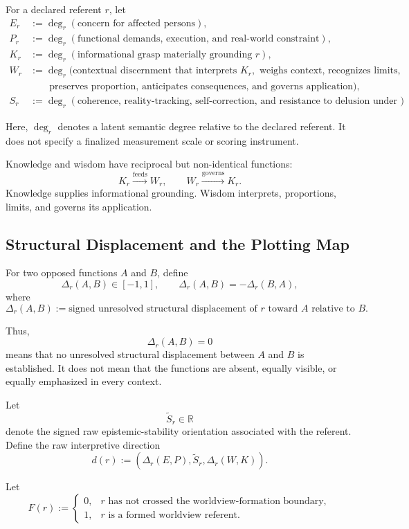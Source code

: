 \documentclass[11pt]{article}
\begin{document}
For a declared referent $r$, let
\[
\begin{aligned}
E_r
&:=
\deg_r(\text{concern for affected persons}),\\
P_r
&:=
\deg_r(\text{functional demands, execution, and real-world constraint}),\\
K_r
&:=
\deg_r(\text{informational grasp materially grounding }r),\\
W_r
&:=
\deg_r(\text{contextual discernment that interprets }K_r,\text{ weighs context, recognizes limits,}\\
&\qquad\text{preserves proportion, anticipates consequences, and governs application}),\\
S_r
&:=
\deg_r(\text{coherence, reality-tracking, self-correction, and resistance to delusion under pressure}).
\end{aligned}
\]

Here, $\deg_r$ denotes a latent semantic degree relative to the declared referent. It does not specify a finalized measurement scale or scoring instrument.

Knowledge and wisdom have reciprocal but non-identical functions:
\[
K_r\xrightarrow{\mathrm{feeds}}W_r,
\qquad
W_r\xrightarrow{\mathrm{governs}}K_r.
\]
Knowledge supplies informational grounding. Wisdom interprets, proportions, limits, and governs its application.

\subsection{Structural Displacement and the Plotting Map}

For two opposed functions $A$ and $B$, define
\[
\Delta_r(A,B)\in[-1,1],
\qquad
\Delta_r(A,B)=-\Delta_r(B,A),
\]
where
\[
\Delta_r(A,B)
:=
\text{signed unresolved structural displacement of }r
\text{ toward }A\text{ relative to }B.
\]

Thus,
\[
\Delta_r(A,B)=0
\]
means that no unresolved structural displacement between $A$ and $B$ is established. It does not mean that the functions are absent, equally visible, or equally emphasized in every context.

Let
\[
\widetilde S_r\in\mathbb R
\]
denote the signed raw epistemic-stability orientation associated with the referent. Define the raw interpretive direction
\[
d(r)
:=
\left(
\Delta_r(E,P),
\widetilde S_r,
\Delta_r(W,K)
\right).
\]

Let
\[
F(r):=
\begin{cases}
0,&r\text{ has not crossed the worldview-formation boundary},\\
1,&r\text{ is a formed worldview referent}.
\end{cases}
\]
\end{document}
